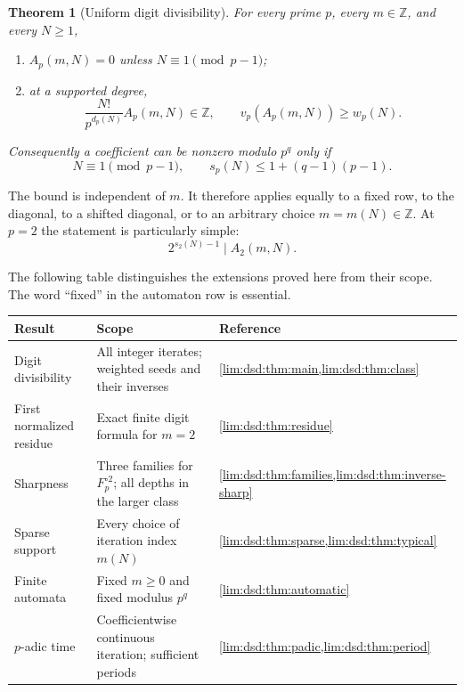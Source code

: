\documentclass[11pt]{article}
\newtheorem{theorem}{Theorem}[section]
\theoremstyle{definition}
\theoremstyle{remark}
\newcommand{\Z}{\mathbb Z}
\begin{document}
\begin{theorem}[Uniform digit divisibility]
\label{lim:dsd:thm:main}
For every prime $p$, every $m\in\Z$, and every $N\ge1$,
\begin{enumerate}[label=\textup{(\roman*)}]
\item $A_p(m,N)=0$ unless $N\equiv1\pmod{p-1}$;
\item at a supported degree,
\begin{equation}
 \frac{N!}{p^{d_p(N)}}A_p(m,N)\in\Z,
 \qquad
 v_p(A_p(m,N))\ge w_p(N).
 \label{lim:dsd:eq:main}
\end{equation}
\end{enumerate}
Consequently a coefficient can be nonzero modulo $p^q$ only if
\begin{equation}
 N\equiv1\pmod{p-1},\qquad
 s_p(N)\le 1+(q-1)(p-1).
 \label{lim:dsd:eq:cutoff}
\end{equation}
\end{theorem}

The bound is independent of $m$. It therefore applies equally to a fixed
row, to the diagonal, to a shifted diagonal, or to an arbitrary choice
$m=m(N)\in\Z$. At $p=2$ the statement is particularly simple:
\begin{equation}
 2^{s_2(N)-1}\mid A_2(m,N).
 \label{lim:dsd:eq:binary-main}
\end{equation}

The following table distinguishes the extensions proved here from their
scope. The word ``fixed'' in the automaton row is essential.
\begin{center}
\small
\begin{tabular}{@{}L{0.27\textwidth}L{0.47\textwidth}L{0.17\textwidth}@{}}
\toprule
Result & Scope & Reference\\
\midrule
Digit divisibility & All integer iterates; weighted seeds and their inverses &
\cref{lim:dsd:thm:main,lim:dsd:thm:class}\\
First normalized residue & Exact finite digit formula for $m=2$ &
\cref{lim:dsd:thm:residue}\\
Sharpness & Three families for $F_p^{\circ2}$; all depths in the larger class &
\cref{lim:dsd:thm:families,lim:dsd:thm:inverse-sharp}\\
Sparse support & Every choice of iteration index $m(N)$ &
\cref{lim:dsd:thm:sparse,lim:dsd:thm:typical}\\
Finite automata & Fixed $m\ge0$ and fixed modulus $p^q$ &
\cref{lim:dsd:thm:automatic}\\
$p$-adic time & Coefficientwise continuous iteration; sufficient periods &
\cref{lim:dsd:thm:padic,lim:dsd:thm:period}\\
\bottomrule
\end{tabular}
\end{center}
\end{document}
